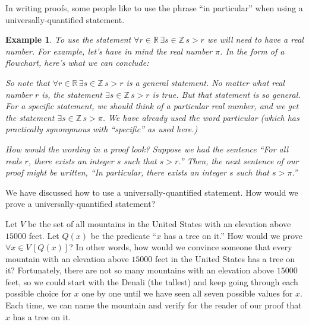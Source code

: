 \documentclass{book}
\newcounter{ekcounter}%
\theoremstyle{ekimcustom}
\newtheorem{example}[ekcounter]{Example}
\begin{document}
In writing proofs, some people like to use the phrase ``in particular'' when using a universally-quantified statement.
\begin{example}
To use the statement $\forall r \in \mathbb{R}\,\exists s \in \mathbb{Z}\,s>r$ we will need to have a real number. For example, let's have in mind the real number $\pi$. In the form of a flowchart, here's what we can conclude:
\begin{center}
\end{center}
So note that $\forall r \in \mathbb{R}\,\exists s \in \mathbb{Z}\,s>r$ is a general statement. No matter what real number $r$ is, the statement $\exists s \in \mathbb{Z}\,s>r$ is true. But that statement is so general. For a specific statement, we should think of a particular real number, and we get the statement $\exists s \in \mathbb{Z}\,s> \pi$. We have already used the word particular (which has practically synonymous with ``specific'' as used here.)

How would the wording in a proof look? Suppose we had the sentence ``For all reals $r$, there exists an integer $s$ such that $s>r$.'' Then, the next sentence of our proof might be written, ``In particular, there exists an integer $s$ such that $s > \pi$.''
\end{example}

We have discussed how to use a universally-quantified statement. How would we prove a universally-quantified statement? 

Let $V$ be the set of all mountains in the United States with an elevation above $15000$ feet. Let $Q(x)$ be the predicate ``$x$ has a tree on it.''  How would we prove $\forall x \in V\,[Q(x)]$? In other words, how would we convince someone that every mountain with an elevation above $15000$ feet in the United States has a tree on it? Fortunately, there are not so many mountains with an elevation above $15000$ feet, so we could start with the Denali (the tallest) and keep going through each possible choice for $x$ one by one until we have seen all seven possible values for $x$. Each time, we can name the mountain and verify for the reader of our proof that $x$ has a tree on it.
\end{document}
